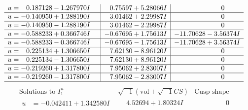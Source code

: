 \documentclass[1p]{elsarticle_modified}
\theoremstyle{definition}
\newcommand{\I}{\sqrt{-1}}
\begin{document}
$$\begin{array}{c|c|c}
\begin{aligned}
u &= \phantom{-}0.187128 - 1.267970 I\end{aligned}
 & \phantom{-}0.75597 + 5.28066 I & \phantom{-0.000000 } 0 \\ \hline\begin{aligned}
u &= -0.140950 + 1.288190 I\end{aligned}
 & \phantom{-}3.01462 + 2.29987 I & \phantom{-0.000000 } 0 \\ \hline\begin{aligned}
u &= -0.140950 - 1.288190 I\end{aligned}
 & \phantom{-}3.01462 - 2.29987 I & \phantom{-0.000000 } 0 \\ \hline\begin{aligned}
u &= -0.588233 + 0.366746 I\end{aligned}
 & -0.67695 + 1.75613 I & -11.70628 - 3.56374 I \\ \hline\begin{aligned}
u &= -0.588233 - 0.366746 I\end{aligned}
 & -0.67695 - 1.75613 I & -11.70628 + 3.56374 I \\ \hline\begin{aligned}
u &= \phantom{-}0.225134 + 1.306650 I\end{aligned}
 & \phantom{-}7.62130 - 8.96120 I & \phantom{-0.000000 } 0 \\ \hline\begin{aligned}
u &= \phantom{-}0.225134 - 1.306650 I\end{aligned}
 & \phantom{-}7.62130 + 8.96120 I & \phantom{-0.000000 } 0 \\ \hline\begin{aligned}
u &= -0.219260 + 1.317800 I\end{aligned}
 & \phantom{-}7.95062 + 2.83007 I & \phantom{-0.000000 } 0 \\ \hline\begin{aligned}
u &= -0.219260 - 1.317800 I\end{aligned}
 & \phantom{-}7.95062 - 2.83007 I & \phantom{-0.000000 } 0\\
 \hline 
 \end{array}$$\newpage$$\begin{array}{c|c|c}  
\text{Solutions to }I^u_{1}& \I (\text{vol} + \sqrt{-1}CS) & \text{Cusp shape}\\
 \hline 
\begin{aligned}
u &= -0.042411 + 1.342580 I\end{aligned}
 & \phantom{-}4.52694 + 1.80324 I & \phantom{-0.000000 } 0 \\ \hline\begin{aligned}

\end{aligned}
\end{array}$$
\end{document}
